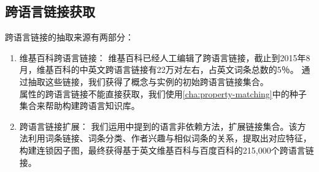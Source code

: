 %
%
%
%
%

\subsection{跨语言链接获取}
\label{sec5:cross-lingual}

跨语言链接的抽取来源有两部分：
\begin{enumerate}[1.]
\item {\heiti 维基百科跨语言链接：} 维基百科已经人工编辑了跨语言链接，截止到2015年8月，维基百科的中英文跨语言链接有22万对左右，占英文词条总数的5％。 通过抽取这些链接，我们获得了概念与实例的初始跨语言链接集合。 \\
属性的跨语言链接不能直接获取，我们使用\ref{cha:property-matching}中的种子集合来帮助构建跨语言知识库。

\item {\heiti 跨语言链接扩展：} 我们运用\cite{wang2012cross}中提到的语言非依赖方法，扩展链接集合。该方法利用词条链接、词条分类、作者兴趣与相似词条的关系，提取出对应特征，构建连锁因子图，最终获得基于英文维基百科与百度百科的215,000个跨语言链接。
\end{enumerate}

